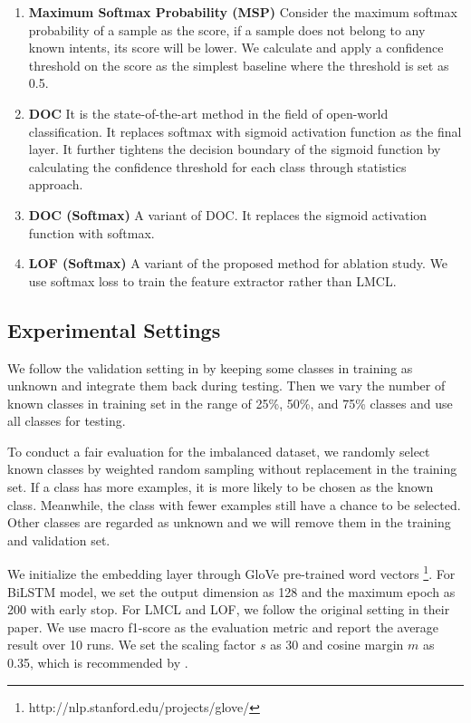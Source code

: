 \documentclass[11pt,a4paper]{article}
\begin{document}
\begin{enumerate}[noitemsep,topsep=0pt]
  \item \textbf{Maximum Softmax Probability (MSP)}  \cite{hendrycks2016baseline} Consider the maximum softmax probability of a sample as the score, if a sample does not belong to any known intents, its score will be lower. We calculate and apply a confidence threshold on the score as the simplest baseline where the threshold is set as 0.5. 
  \item \textbf{DOC} \cite{Shu2017DOCDO} 
It is the state-of-the-art method in the field of open-world classification. It replaces softmax with sigmoid activation function as the final layer. It further tightens the decision boundary of the sigmoid function by calculating the confidence threshold for each class through statistics approach.
  \item \textbf{DOC (Softmax)} A variant of DOC. It replaces the sigmoid activation function with softmax. 
  \item \textbf{LOF (Softmax)} A variant of the proposed method for ablation study. We use softmax loss to train the feature extractor rather than LMCL.
\end{enumerate}

\subsection{Experimental Settings}
We follow the validation setting in \cite{Fei2016BreakingTC, Shu2017DOCDO} by keeping some classes in training as unknown and integrate them back during testing. Then we vary the number of known classes in training set in the range of 25\%, 50\%, and 75\% classes and use all classes for testing. 

To conduct a fair evaluation for the imbalanced dataset, we randomly select known classes by weighted random sampling without replacement in the training set. If a class has more examples, it is more likely to be chosen as the known class. Meanwhile, the class with fewer examples still have a chance to be selected. Other classes are regarded as unknown and we will remove them in the training and validation set.

We initialize the embedding layer through GloVe \cite{pennington2014glove} pre-trained word vectors \footnote{http://nlp.stanford.edu/projects/glove/}. For BiLSTM model, we set the output dimension as 128 and the maximum epoch as 200 with early stop. For LMCL and LOF, we follow the original setting in their paper. We use macro f1-score as the evaluation metric and report the average result over 10 runs. We set the scaling factor $s$ as 30 and cosine margin $m$ as 0.35, which is recommended by \citet{wang2018additive}.
\end{document}
